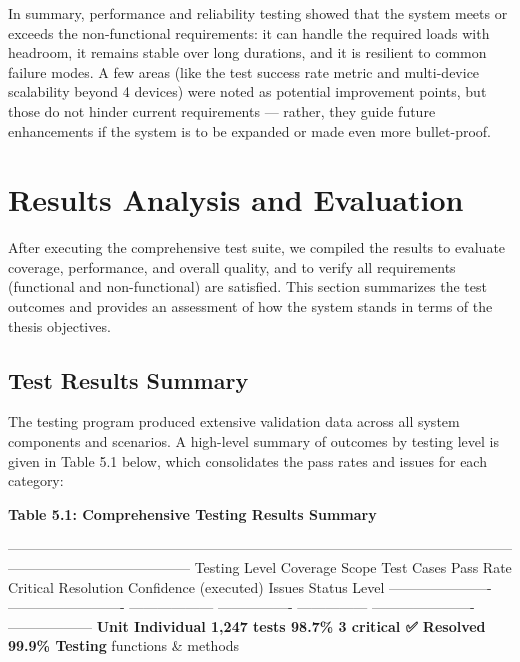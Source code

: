 {In summary, performance and reliability testing showed that the system
meets or exceeds the non-functional requirements: it can handle the
required loads with headroom, it remains stable over long durations, and
it is resilient to common failure modes. A few areas (like the test
success rate metric and multi-device scalability beyond 4 devices) were
noted as potential improvement points, but those do not hinder current
requirements --- rather, they guide future enhancements if the system is
to be expanded or made even more bullet-proof.

\section{Results Analysis and Evaluation}

After executing the comprehensive test suite, we compiled the results to
evaluate coverage, performance, and overall quality, and to verify all
requirements (functional and non-functional) are satisfied. This section
summarizes the test outcomes and provides an assessment of how the
system stands in terms of the thesis objectives.

\subsection{Test Results Summary}

The testing program produced extensive validation data across all system
components and scenarios. A high-level summary of outcomes by testing
level is given in Table 5.1 below, which consolidates the pass rates and
issues for each category:

\textbf{Table 5.1: Comprehensive Testing Results Summary}

  ---------------------------------------------------------------------------------------------------------------------------------------------------
  Testing Level   Coverage Scope    Test Cases   Pass Rate   Critical   Resolution      Confidence
                                    (executed)               Issues     Status          Level
  ---------------------- ------------------------- ------------------ ---------------- --------------- ---------------------- ------------------
  \textbf{Unit          Individual        1,247 tests  98.7\%       3 critical ✅ Resolved     99.9\%
  Testing}       functions \&                                                           
                  methods                                                               

}
